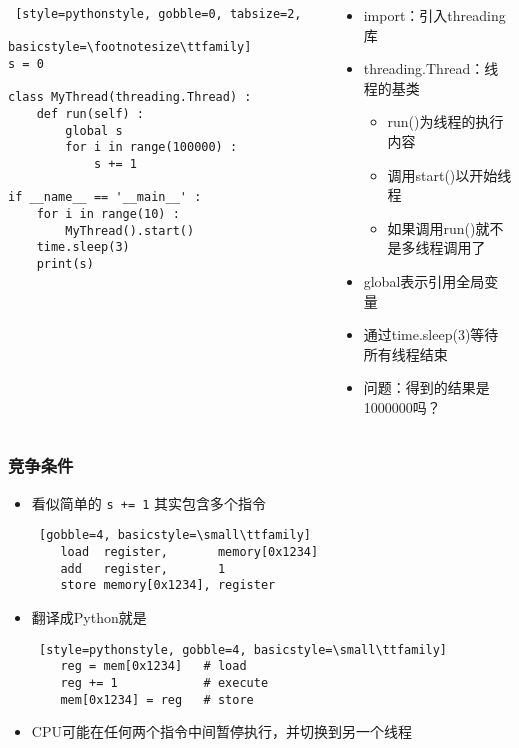 \begin{CJK}{UTF8}{gbsn}
\begin{frame} [fragile]
\begin{columns}[T]
\begin{column}[T]{.5\textwidth}
\begin{lstlisting} [style=pythonstyle, gobble=0, tabsize=2, 
								basicstyle=\footnotesize\ttfamily]
s = 0

class MyThread(threading.Thread) :
	def run(self) :
		global s
		for i in range(100000) :
			s += 1

if __name__ == '__main__' :
	for i in range(10) :
		MyThread().start()
	time.sleep(3)
	print(s)
			\end{lstlisting}
		\end{column}
		\begin{column}[T]{.5\textwidth}
			\begin{itemize}
			\item import：引入threading库
			\item threading.Thread：线程的基类
				\begin{itemize}
				\item run()为线程的执行内容
				\item 调用start()以开始线程
				\item 如果调用run()就不是多线程调用了
				\end{itemize}
			\item global表示引用全局变量
			\item 通过time.sleep(3)等待所有线程结束
			\item 问题：得到的结果是1000000吗？
			\end{itemize}
		\end{column}
	\end{columns}
\end{frame}

\begin{frame}[fragile]
	\frametitle{竞争条件}
	\begin{itemize}
	\item 看似简单的 \texttt{s += 1} 其实包含多个指令
	\begin{lstlisting} [gobble=4, basicstyle=\small\ttfamily]
	load  register,       memory[0x1234]
	add   register,       1
	store memory[0x1234], register
	\end{lstlisting}
	\item 翻译成Python就是
	\begin{lstlisting} [style=pythonstyle, gobble=4, basicstyle=\small\ttfamily]
	reg = mem[0x1234]	# load
	reg += 1			# execute
	mem[0x1234] = reg	# store
	\end{lstlisting}
	\item CPU可能在任何两个指令中间暂停执行，并切换到另一个线程
	\end{itemize}
\end{frame}


\end{CJK}
